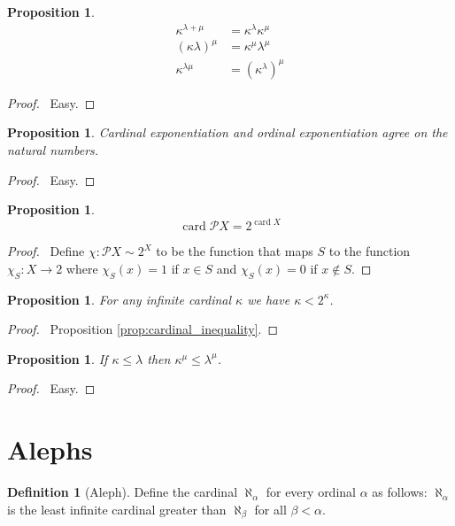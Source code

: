 \documentclass{report}
\let\qed\relax
\newtheorem{prop}[ax]{Proposition}
\theoremstyle{definition}
\newtheorem{df}[ax]{Definition}
\newcommand{\card}{\ensuremath{\operatorname{card}}}
\begin{document}
\begin{prop}
\begin{align*}
\kappa^{\lambda + \mu} & = \kappa^\lambda \kappa^\mu \\
(\kappa \lambda)^\mu & = \kappa^\mu \lambda^\mu \\
\kappa^{\lambda \mu} & = (\kappa^\lambda)^\mu
\end{align*}
\end{prop}

\begin{proof}
\pf\ Easy. \qed
\end{proof}

\begin{prop}
Cardinal exponentiation and ordinal exponentiation agree on the natural numbers.
\end{prop}

\begin{proof}
\pf\ Easy. \qed
\end{proof}

\begin{prop}
\[ \card \mathcal{P} X = 2^{\card X} \]
\end{prop}

\begin{proof}
\pf\ Define $\chi : \mathcal{P} X \sim 2^X$ to be the function that maps $S$ to the function $\chi_S : X \rightarrow 2$ where $\chi_S(x) = 1$ if $x \in S$ and $\chi_S(x) = 0$ if $x \notin S$. \qed
\end{proof}

\begin{prop}
For any infinite cardinal $\kappa$ we have $\kappa < 2^\kappa$.
\end{prop}

\begin{proof}
\pf\ Proposition \ref{prop:cardinal_inequality}. \qed
\end{proof}

\begin{prop}
If $\kappa \leq \lambda$ then $\kappa^\mu \leq \lambda^\mu$.
\end{prop}

\begin{proof}
\pf\ Easy. \qed
\end{proof}

\section{Alephs}

\begin{df}[Aleph]
Define the cardinal $\aleph_\alpha$ for every ordinal $\alpha$ as follows: $\aleph_\alpha$ is the least infinite cardinal greater than $\aleph_\beta$ for all $\beta < \alpha$.
\end{df}
\end{document}
